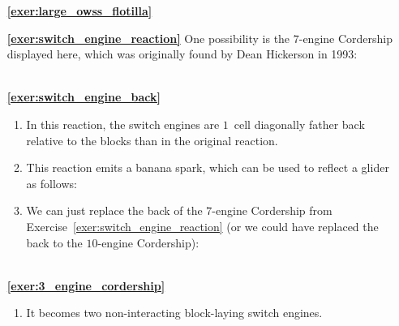 \begin{multicols}{2}
\begin{itemize}[leftmargin=0em]
\begin{enumerate}[leftmargin=1.5em,label=\bf\color{ocre}(\alph*)]
			\item {}
			
			\item {} \\
		\end{enumerate}
		
		
		\item[\bf\color{ocre}\sffamily\ref{exer:large_owss_flotilla}]  \\
		
		
		\item[\bf\color{ocre}\sffamily\ref{exer:switch_engine_reaction}] One possibility is the $7$-engine Cordership displayed here, which was originally found by Dean Hickerson in 1993: \\[-0.6em]
		
		 \\
		
		
		\item[\bf\color{ocre}\sffamily\ref{exer:switch_engine_back}]
		\begin{enumerate}[leftmargin=1.5em,label=\bf\color{ocre}(\alph*)]
			\item In this reaction, the switch engines are $1$~cell diagonally father back relative to the blocks than in the original reaction.
			
			\item This reaction emits a banana spark, which can be used to reflect a glider as follows: \\[-0.6em]
			
			
			\item We can just replace the back of the $7$-engine Cordership from Exercise~\ref{exer:switch_engine_reaction} (or we could have replaced the back to the $10$-engine Cordership): \\[-0.6em]
			
			 \\
		\end{enumerate}
		
		
		\item[\bf\color{ocre}\sffamily\ref{exer:3_engine_cordership}]
		\begin{enumerate}[leftmargin=1.5em,label=\bf\color{ocre}(\alph*)]
			\item It becomes two non-interacting block-laying switch engines.
			

\end{enumerate}
\end{itemize}
\end{multicols}
